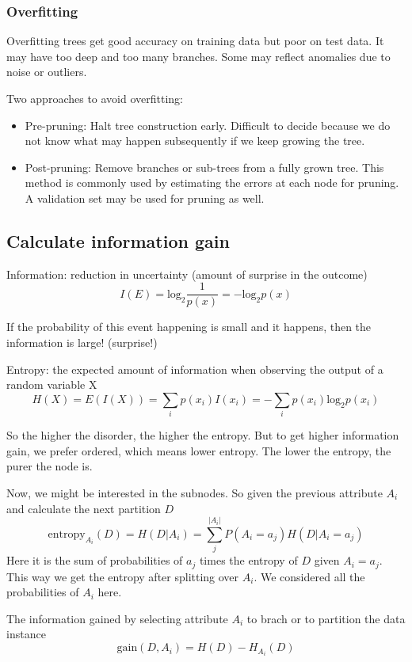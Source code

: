 \documentclass[letterpaper,12pt]{article}
\begin{document}
\subsubsection{Overfitting}
Overfitting trees get good accuracy on training data but poor on test data. It may have too deep and too many branches. Some may reflect anomalies due to noise or outliers.

Two approaches to avoid overfitting:
\begin{itemize}
    \item Pre-pruning: Halt tree construction early. Difficult to decide because we do
          not know what may happen subsequently if we keep growing the tree.
    \item Post-pruning: Remove branches or sub-trees from a fully grown tree. This method
          is commonly used by estimating the errors at each node for pruning. A
          validation set may be used for pruning as well.
\end{itemize}

\subsection{Calculate information gain}
Information: reduction in uncertainty (amount of surprise in the outcome)
\[
    I(E)=\text{log}_2 \frac{1}{p(x)}=-   \text{log}_2p(x)
\]

If the probability of this event happening is small and it happens, then the
information is large! (surprise!)

Entropy: the expected amount of information when observing the output of a
random variable X
\[
    H(X)=E(I(X))=\sum_i p(x_i)I(x_i)=-\sum_i p(x_i)\text{log}_2 p(x_i)
\]

So the higher the disorder, the higher the entropy. But to get higher information
gain, we prefer ordered, which means lower entropy. The lower the entropy, the purer
the node is.

Now, we might be interested in the sub\-nodes. So given the previous attribute
$A_i$ and calculate the next partition $D$
\[
    \text{entropy}_{A_i}(D)=H(D|A_i)=\sum_{j}^{|A_i|} P(A_i=a_j)H(D|A_i=a_j)
\]
Here it is the sum of probabilities of $a_j$ times the entropy of $D$ given $A_i=a_j$. This way we get the entropy after splitting over $A_i$. We considered all the probabilities of $A_i$ here. 

The information gained by selecting attribute $A_i$ to brach or to partition the
data instance
\[
    \text{gain}(D,A_i)=H(D)-H_{A_i}(D)
\]
\end{document}
